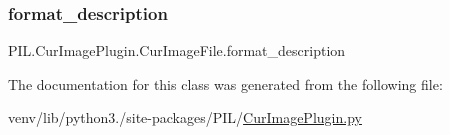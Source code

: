 \subsubsection{\texorpdfstring{format\+\_\+description}{format\_description}}
{\footnotesize\ttfamily P\+I\+L.\+Cur\+Image\+Plugin.\+Cur\+Image\+File.\+format\+\_\+description\hspace{0.3cm}{\ttfamily [static]}}



The documentation for this class was generated from the following file\+:\begin{DoxyCompactItemize}
\item 
venv/lib/python3./site-\/packages/\+P\+I\+L/\hyperlink{CurImagePlugin_8py}{Cur\+Image\+Plugin.\+py}\end{DoxyCompactItemize}
